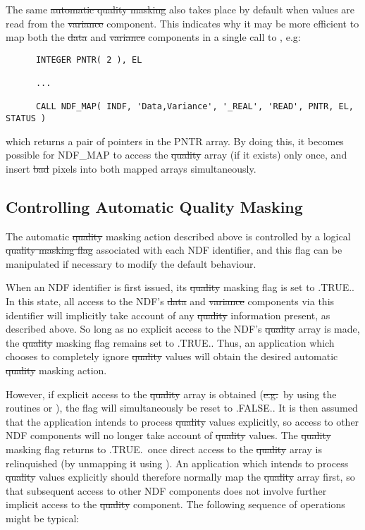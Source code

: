 The same \st{automatic quality masking\/} also takes place by default when 
values are read from the \st{variance\/} component.
This indicates why it may be more efficient to map both the \st{data\/} and
\st{variance\/} components in a single call to , e.g:

\small
\begin{verbatim}
      INTEGER PNTR( 2 ), EL

      ...

      CALL NDF_MAP( INDF, 'Data,Variance', '_REAL', 'READ', PNTR, EL, STATUS )
\end{verbatim}
\normalsize

which returns a pair of pointers in the PNTR array.
By doing this, it becomes possible for NDF\_MAP to access the \st{quality\/}
array (if it exists) only once, and insert \st{bad\/} pixels into both mapped
arrays simultaneously. 

\subsection{Controlling Automatic Quality Masking}

The automatic \st{quality\/} masking action described above is controlled by a
logical \st{quality masking flag\/} associated with each NDF identifier, and
this flag can be manipulated if necessary to modify the default behaviour. 

When an NDF identifier is first issued, its \st{quality\/} masking flag is set to 
.TRUE..
In this state, all access to the NDF's \st{data\/} and \st{variance\/} components
via this identifier will implicitly take account of any \st{quality\/}
information present, as described above. 
So long as no explicit access to the NDF's \st{quality\/} array is made, the
\st{quality\/} masking flag remains set to .TRUE.. 
Thus, an application which chooses to completely ignore \st{quality\/} values
will obtain the desired automatic \st{quality\/} masking action.

However, if explicit access to the \st{quality\/} array is obtained
(\st{e.g.}\ by using the routines  or
), the flag will 
simultaneously be reset to .FALSE.. 
It is then assumed that the application intends to process \st{quality\/} values
explicitly, so access to other NDF components will no longer take account of
\st{quality\/} values. 
The \st{quality\/} masking flag returns to .TRUE.\ once direct access to the
\st{quality\/} array is relinquished (by unmapping it using ).
An application which intends to process \st{quality\/} values explicitly should 
therefore normally map the \st{quality\/} array first, so that subsequent access
to  other NDF components does not involve further implicit access to
the \st{quality\/} component. 
The following sequence of operations might be typical:

